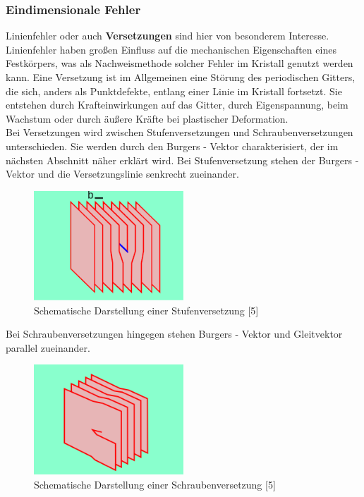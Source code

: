         \subsubsection*{Eindimensionale Fehler}
            Linienfehler oder auch \textbf{Versetzungen} sind hier von besonderem Interesse. Linienfehler haben 
            großen Einfluss auf die mechanischen Eigenschaften eines Festkörpers, was
            als Nachweismethode solcher Fehler im Kristall genutzt werden kann. Eine Versetzung ist im Allgemeinen eine Störung des periodischen Gitters, 
            die sich, anders als Punktdefekte, entlang einer Linie im Kristall fortsetzt. Sie entstehen durch Krafteinwirkungen auf das Gitter,
            durch Eigenspannung, beim Wachstum oder durch äußere Kräfte bei plastischer Deformation.\\
            Bei Versetzungen wird zwischen Stufenversetzungen und Schraubenversetzungen unterschieden.
            Sie werden durch den Burgers - Vektor charakterisiert, der im nächsten Abschnitt näher erklärt wird.
            Bei Stufenversetzung stehen der Burgers - Vektor und die Versetzungslinie senkrecht zueinander.
            \begin{figure}[H]
                \centering
                \includegraphics[width=0.5\textwidth]{Images/Stufenversetzung.png}
                \caption{Schematische Darstellung einer Stufenversetzung [5]}
            \end{figure}
            Bei Schraubenversetzungen hingegen stehen Burgers - Vektor und Gleitvektor parallel zueinander.
            \begin{figure}[H]
                \centering
                \includegraphics[width=0.5\textwidth]{Images/Schraubenversetzung.png}
                \caption{Schematische Darstellung einer Schraubenversetzung [5]}
            \end{figure}
